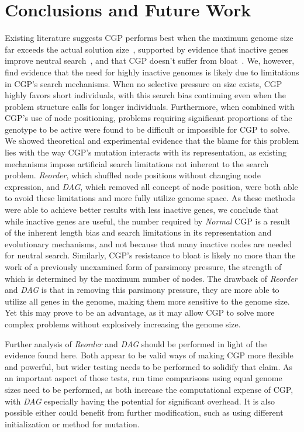 \documentclass{sig-alternate}
\begin{document}
\section{Conclusions and Future Work}
\label{sec-conclusion}
Existing literature suggests CGP performs best when the maximum genome size
far exceeds the actual solution size~\cite{miller:2006:redundancy}, supported by
evidence that inactive genes improve neutral search~\cite{yu:2001:neutrality},
and that CGP doesn't suffer from bloat~\cite{miller:2001:bloat}.  We, however, find evidence
that the need for highly inactive genomes is likely due to limitations in CGP's
search mechanisms.  When no selective pressure on size exists, CGP highly favors
short individuals, with this search bias continuing even when the problem structure
calls for longer individuals.  Furthermore, when combined with CGP's use of node
positioning, problems requiring significant proportions of the genotype to be
active were found to be difficult or impossible for CGP to solve.  We showed theoretical
and experimental evidence that the blame for this problem lies with the way CGP's mutation
interacts with its representation, as existing mechanisms impose artificial search limitations
not inherent to the search problem.  \emph{Reorder}, which shuffled node positions
without changing node expression, and \emph{DAG}, which removed all concept of node
position, were both able to avoid these limitations and more fully utilize
genome space.  As these methods were able to achieve better results with less
inactive genes, we conclude that while inactive genes are useful, the number required
by \emph{Normal} CGP is a result of the inherent length bias and search limitations in its
representation and evolutionary mechanisms, and not because that many inactive
nodes are needed for neutral search.  Similarly, CGP's resistance to bloat is likely
no more than the work of a previously unexamined form of parsimony pressure, the strength
of which is determined by the maximum number of nodes.  The drawback of \emph{Reorder} and
\emph{DAG} is that in removing this parsimony pressure, they are more able to utilize
all genes in the genome, making them more sensitive to the genome size.  Yet this
may prove to be an advantage, as it may allow CGP to solve more complex problems without
explosively increasing the genome size.

Further analysis of \emph{Reorder} and \emph{DAG} should be performed in light
of the evidence found here.  Both appear to be valid ways of making CGP more flexible
and powerful, but wider testing needs to be performed to solidify that claim.  As
an important aspect of those tests, run time comparisons using equal genome sizes need to be performed, as
both increase the computational expense of CGP, with \emph{DAG} especially having
the potential for significant overhead.  It is also possible either could benefit
from further modification, such as using different initialization or method for mutation.
\end{document}
